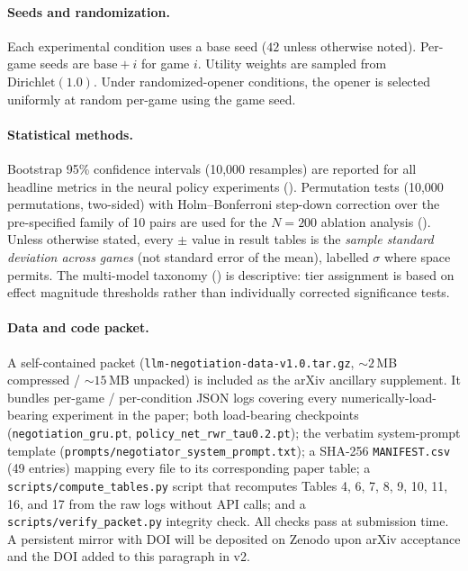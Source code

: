 \documentclass[11pt,a4paper]{article}
\begin{document}
\paragraph{Seeds and randomization.} Each experimental condition uses a base seed ($42$ unless otherwise noted). Per-game seeds are $\text{base} + i$ for game $i$. Utility weights are sampled from $\text{Dirichlet}(1.0)$. Under randomized-opener conditions, the opener is selected uniformly at random per-game using the game seed.

\paragraph{Statistical methods.} Bootstrap 95\% confidence intervals (10,000 resamples) are reported for all headline metrics in the neural policy experiments (). Permutation tests (10,000 permutations, two-sided) with Holm--Bonferroni step-down correction over the pre-specified family of 10 pairs are used for the $N\!=\!200$ ablation analysis (). Unless otherwise stated, every $\pm$ value in result tables is the \emph{sample standard deviation across games} (not standard error of the mean), labelled $\sigma$ where space permits. The multi-model taxonomy () is descriptive: tier assignment is based on effect magnitude thresholds rather than individually corrected significance tests.

\paragraph{Data and code packet.} A self-contained packet (\texttt{llm-negotiation-data-v1.0.tar.gz}, $\sim\!2$\,MB compressed / $\sim\!15$\,MB unpacked) is included as the arXiv ancillary supplement. It bundles per-game / per-condition JSON logs covering every numerically-load-bearing experiment in the paper; both load-bearing checkpoints (\texttt{negotiation\_gru.pt}, \texttt{policy\_net\_rwr\_tau0.2.pt}); the verbatim system-prompt template (\texttt{prompts/negotiator\_system\_prompt.txt}); a SHA-256 \texttt{MANIFEST.csv} (49 entries) mapping every file to its corresponding paper table; a \texttt{scripts/compute\_tables.py} script that recomputes Tables 4, 6, 7, 8, 9, 10, 11, 16, and 17 from the raw logs without API calls; and a \texttt{scripts/verify\_packet.py} integrity check. All checks pass at submission time. A persistent mirror with DOI will be deposited on Zenodo upon arXiv acceptance and the DOI added to this paragraph in v2.
\end{document}
